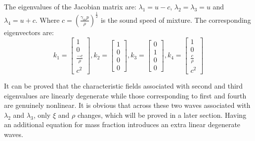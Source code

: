 The eigenvalues of the Jacobian matrix are: $\lambda_1 = u-c$,  $\lambda_2 = \lambda_3 = u$ and $\lambda_4 = u+c$. Where $c=(\frac{\gamma_m p}{\rho})^{\frac{1}{2}}$ is the sound speed of mixture. The corresponding eigenvectors are: 
\begin{equation}
   k_1 =\begin{bmatrix}
         1 \\
         0 \\
         \frac{-c}{\rho} \\
         c^2
     \end{bmatrix},
   k_2 =\begin{bmatrix}
         1 \\
         0 \\
         0   \\
         0
     \end{bmatrix},
   k_3 =\begin{bmatrix}
         0 \\
         1 \\
         0   \\
         0
     \end{bmatrix},
   k_4 =\begin{bmatrix}
         1 \\
         0 \\
         \frac{c}{\rho} \\
         c^2
     \end{bmatrix}
     \label{eq:eigenvector-pressure}
\end{equation}

It can be proved that the characteristic fields associated with second and third eigenvalues are linearly degenerate while those corresponding to first and fourth are genuinely nonlinear. It is obvious that across these two waves associated with $\lambda_2$ and $\lambda_3$, only $\xi$ and $\rho$ changes, which will be proved in a later section. Having an additional equation for mass fraction introduces an extra linear degenerate waves.

